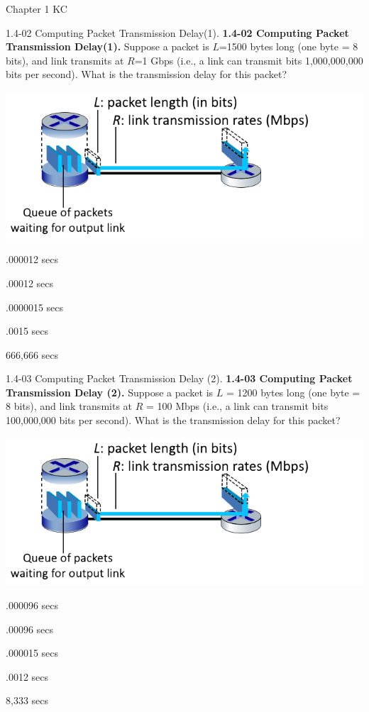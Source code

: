 \documentclass[a4paper]{article}
\begin{document}
\begin{quiz}{Chapter 1 KC}
\begin{multi}[points=1]{1.4-02 Computing Packet Transmission Delay(1).}
\textbf{1.4-02 Computing Packet Transmission Delay(1).} 
Suppose a packet is $L$=1500 bytes long (one byte = 8 bits), and link transmits at $R$=1 Gbps (i.e., a link can transmit bits 1,000,000,000 bits per second).  
What is the transmission delay for this packet?
\begin{center}
\includegraphics[width=\linewidth]{figs/1.4.2.png}
\end{center}
%
\item* .000012 secs
\item .00012 secs
\item .0000015 secs
\item .0015 secs
\item 666,666 secs
\end{multi}

\begin{multi}[points=1]{1.4-03 Computing Packet Transmission Delay (2).}
\textbf{1.4-03 Computing Packet Transmission Delay (2).} 
Suppose a packet is $L$ = 1200 bytes long (one byte = 8 bits), and link transmits at $R$ = 100 Mbps (i.e., a link can transmit bits 100,000,000 bits per second).  What is the transmission delay for this packet?
\begin{center}
\includegraphics[width=\linewidth]{figs/1.4.2.png}
\end{center}
%
\item* .000096 secs
\item .00096 secs
\item .000015 secs
\item .0012 secs
\item 8,333 secs
\end{multi}


\end{quiz}
\end{document}
